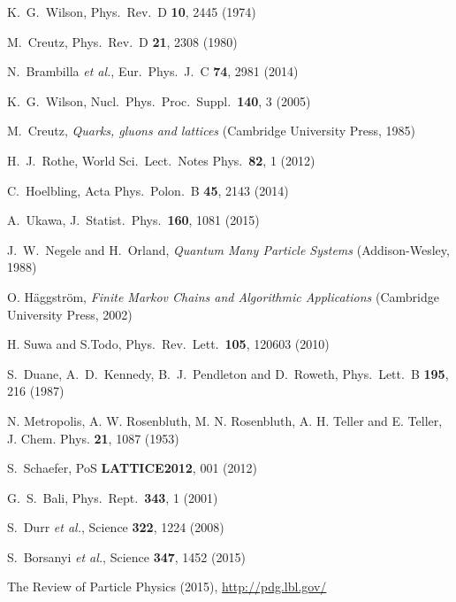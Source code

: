 \begin{thebibliography}{99.}%

  K.~G.~Wilson, Phys.\ Rev.\ D {\bf 10},  2445  (1974)
  
  M.~Creutz, Phys.\ Rev.\ D {\bf 21},  2308 (1980) 
  
  N.~Brambilla {\it et al.}, Eur.\ Phys.\ J.\ C {\bf 74},  2981 (2014)
   
  K.~G.~Wilson,  Nucl.\ Phys.\ Proc.\ Suppl.\  {\bf 140},  3 (2005)
  
  M.~Creutz, {\em Quarks, gluons and lattices} (Cambridge University Press, 1985)
    
  H.~J.~Rothe, World Sci.\ Lect.\ Notes Phys.~{\bf 82}, 1 (2012)

  C.~Hoelbling, Acta Phys.\ Polon.\ B {\bf 45},   2143 (2014)


  A.~Ukawa, J.\ Statist.\ Phys.\  {\bf 160},  1081 (2015)
 
  J.~W.~Negele and H.~Orland,
 {\em Quantum Many Particle Systems} (Addison-Wesley, 1988)   

  O. H\"{a}ggstr\"{o}m,
  {\em Finite Markov Chains and Algorithmic Applications} (Cambridge University Press, 2002)

 H. Suwa and S.Todo,
 Phys.\ Rev.\ Lett.\ {\bf 105},  120603 (2010)

  S.~Duane, A.~D.~Kennedy, B.~J.~Pendleton and D.~Roweth, Phys.\ Lett.\ B {\bf 195},  216 (1987)

  
 N. Metropolis, A. W. Rosenbluth, M. N. Rosenbluth, A. H. Teller and E. Teller, J. Chem. Phys. {\bf 21},  1087 (1953)
  
  S.~Schaefer, PoS {\bf LATTICE2012},  001 (2012)
  
  G.~S.~Bali, Phys.\ Rept.\  {\bf 343},  1 (2001)

  S.~Durr {\it et al.}, Science {\bf 322},  1224 (2008)
  
  S.~Borsanyi {\it et al.}, Science {\bf 347},  1452 (2015)
  
The Review of Particle Physics (2015), \url{http://pdg.lbl.gov/ } 
  

\end{thebibliography}
